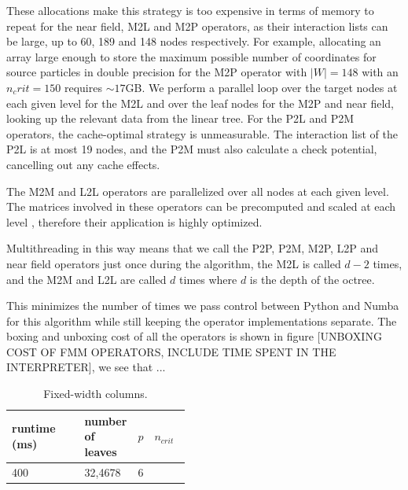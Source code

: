 \documentclass{IEEEcsmag}
\begin{document}
These allocations make this strategy is too expensive in terms of memory to repeat for the near field, M2L and M2P operators, as their interaction lists can be large, up to 60, 189 and 148 nodes respectively. For example, allocating an array large enough to store the maximum possible number of coordinates for source particles in double precision for the M2P operator with $|W|=148$ with an $n_crit=150$ requires $\sim 17$GB. We perform a parallel loop over the target nodes at each given level for the M2L and over the leaf nodes for the M2P and near field, looking up the relevant data from the linear tree. For the P2L and P2M operators, the cache-optimal strategy is unmeasurable. The interaction list of the P2L is at most 19 nodes, and the P2M must also calculate a check potential, cancelling out any cache effects.

The M2M and L2L operators are parallelized over all nodes at each given level. The matrices involved in these operators can be precomputed and scaled at each level \cite{Wang2021}, therefore their application is highly optimized.

Multithreading in this way means that we call the P2P, P2M, M2P, L2P and near field operators just once during the algorithm, the M2L is called $d-2$ times, and the M2M and L2L are called $d$ times where $d$ is the depth of the octree.

This minimizes the number of times we pass control between Python and Numba for this algorithm while still keeping the operator implementations separate. The boxing and unboxing cost of all the operators is shown in figure [UNBOXING COST OF FMM OPERATORS, INCLUDE TIME SPENT IN THE INTERPRETER],
we see that ...

\begin{table}[ht]
\centering
\caption{Fixed-width columns.}
\label{tab:l2p}
\begin{tabular}[t]{l>{\raggedright}p{0.2\linewidth}p{0.05\linewidth}>{\raggedright\arraybackslash}p{0.2\linewidth}}
\toprule
runtime (ms) &number of leaves & $p$ & $n_{crit}$ \\
\midrule
400 & 32,4678 & 6 & 100 \\

\bottomrule
\end{tabular}
\end{table}%
\end{document}
